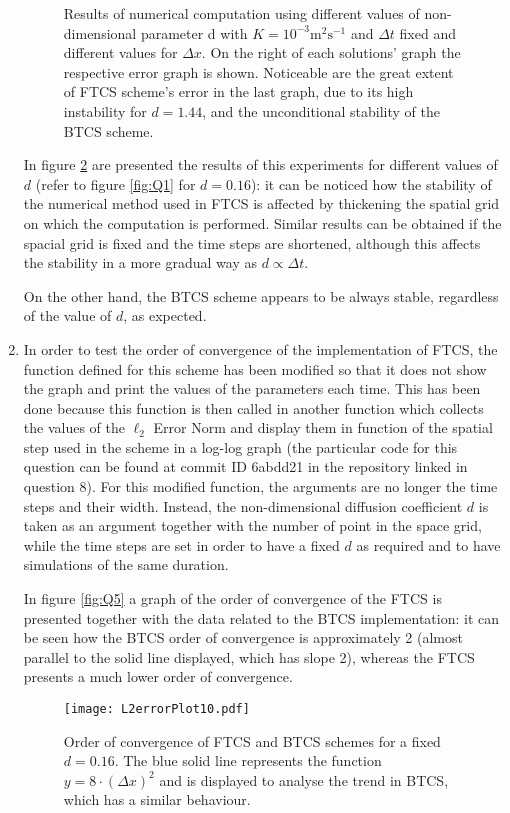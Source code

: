 \documentclass[12pt]{article}
\begin{document}
\begin{enumerate}
\begin{figure}[!tbh]
\caption{Results of numerical computation using different values of non-dimensional parameter d with $K=10^{-3}\text{m}^{2}\text{s}^{-1}$ and $\Delta t$ fixed and different values for $\Delta x$. On the right of each solutions' graph the respective error graph is shown. Noticeable are the great extent of FTCS scheme's error in the last graph, due to its high instability for $d=1.44$, and the unconditional stability of the BTCS scheme.
\label{fig:Q4}}
\end{figure}

In figure \ref{fig:Q4} are presented the results of this experiments for different values of $d$ (refer to figure \ref{fig:Q1} for $d=0.16$): it can be noticed how the stability of the numerical method used in FTCS is affected by thickening the spatial grid on which the computation is performed. Similar results can be obtained if the spacial grid is fixed and the time steps are shortened, although this affects the stability in a more gradual way as $d\propto \Delta t$. \par
On the other hand, the BTCS scheme appears to be always stable, regardless of the value of $d$, as expected.

\item In order to test the order of convergence of the implementation of FTCS, the function defined for this scheme has been modified so that it does not show the graph and print the values of the parameters each time. This has been done because this function is then called in another function which collects the values of the $\ell_2$ Error Norm and display them in function of the spatial step used in the scheme in a log-log graph (the particular code for this question can be found at commit ID 6abdd21 in the repository linked in question 8).
For this modified function, the arguments are no longer the time steps and their width. Instead, the non-dimensional diffusion coefficient $d$ is taken as an argument together with the number of point in the space grid, while the time steps are set in order to have a fixed $d$ as required and to have simulations of the same duration.\par
In figure \ref{fig:Q5} a graph of the order of convergence of the FTCS is presented together with the data related to the BTCS implementation: it can be seen how the BTCS order of convergence is approximately 2 (almost parallel to the solid line displayed, which has slope 2), whereas the FTCS presents a much lower order of convergence.

\begin{figure}[!tbh]
\texttt{[image: L2errorPlot10.pdf]}

\caption{Order of convergence of FTCS and BTCS schemes for a fixed $d=0.16$. The blue solid line represents the function $y=8\cdot(\Delta x)^2$ and is displayed to analyse the trend in BTCS, which has a similar behaviour.
\label{fig:Q4}}
\end{figure}



\end{enumerate}
\end{document}
